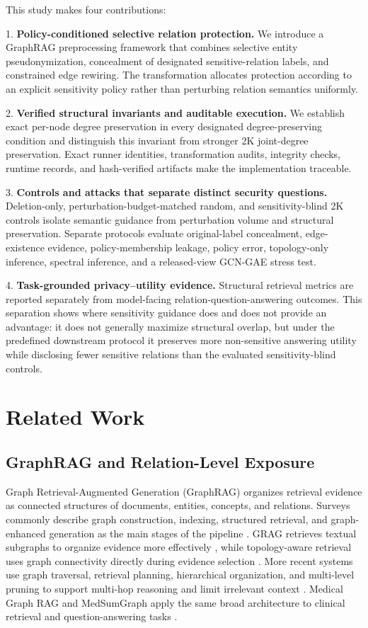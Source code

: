 \documentclass[preprint,12pt]{elsarticle}
\begin{document}
This study makes four contributions:

1. \textbf{Policy-conditioned selective relation protection.} We introduce a GraphRAG preprocessing framework that combines selective entity pseudonymization, concealment of designated sensitive-relation labels, and constrained edge rewiring. The transformation allocates protection according to an explicit sensitivity policy rather than perturbing relation semantics uniformly.

2. \textbf{Verified structural invariants and auditable execution.} We establish exact per-node degree preservation in every designated degree-preserving condition and distinguish this invariant from stronger 2K joint-degree preservation. Exact runner identities, transformation audits, integrity checks, runtime records, and hash-verified artifacts make the implementation traceable.

3. \textbf{Controls and attacks that separate distinct security questions.} Deletion-only, perturbation-budget-matched random, and sensitivity-blind 2K controls isolate semantic guidance from perturbation volume and structural preservation. Separate protocols evaluate original-label concealment, edge-existence evidence, policy-membership leakage, policy error, topology-only inference, spectral inference, and a released-view GCN-GAE stress test.

4. \textbf{Task-grounded privacy--utility evidence.} Structural retrieval metrics are reported separately from model-facing relation-question-answering outcomes. This separation shows where sensitivity guidance does and does not provide an advantage: it does not generally maximize structural overlap, but under the predefined downstream protocol it preserves more non-sensitive answering utility while disclosing fewer sensitive relations than the evaluated sensitivity-blind controls.

\section{Related Work}
\subsection{GraphRAG and Relation-Level Exposure}
Graph Retrieval-Augmented Generation (GraphRAG) organizes retrieval evidence as connected structures of documents, entities, concepts, and relations. Surveys commonly describe graph construction, indexing, structured retrieval, and graph-enhanced generation as the main stages of the pipeline \cite{ref31_peng_2026}. GRAG retrieves textual subgraphs to organize evidence more effectively \cite{ref14_hu_2025a}, while topology-aware retrieval uses graph connectivity directly during evidence selection \cite{ref34_wang_2024}. More recent systems use graph traversal, retrieval planning, hierarchical organization, and multi-level pruning to support multi-hop reasoning and limit irrelevant context \cite{ref19_li_2025,ref30_osipjan_2025,ref40_yu_2026}. Medical Graph RAG and MedSumGraph apply the same broad architecture to clinical retrieval and question-answering tasks \cite{ref18_kim_2026,ref35_wu_2025}.
\end{document}
